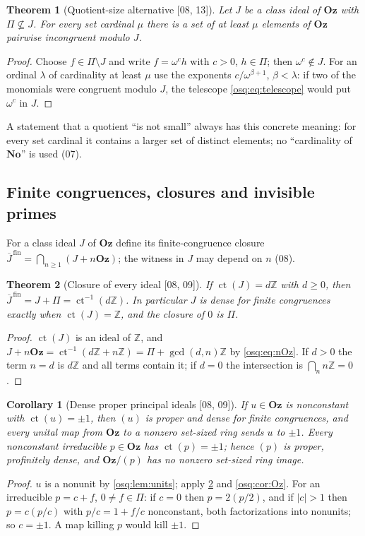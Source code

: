 \documentclass[11pt,letterpaper]{article}
\numberwithin{equation}{section}
\newtheorem{theorem}{Theorem}[section]
\newtheorem{corollary}[corollary]{Corollary}
\theoremstyle{definition}
\theoremstyle{remark}
\theoremstyle{plain}
\newcommand{\No}{\mathbf{No}}
\newcommand{\Oz}{\mathbf{Oz}}
\newcommand{\Z}{\mathbb Z}
\newcommand{\ct}{\operatorname{ct}}
\newcommand{\src}[1]{\textup{\textsf{[#1]}}}
\begin{document}
\begin{theorem}[Quotient-size alternative \src{08, 13}]\label{osq:thm:idealsize}
Let $J$ be a class ideal of $\Oz$ with $\Pi\not\subseteq J$. For every set cardinal $\mu$
there is a set of at least $\mu$ elements of $\Oz$ pairwise incongruent modulo $J$.
\end{theorem}
\begin{proof}
Choose $f\in\Pi\setminus J$ and write $f=\omega^ch$ with $c>0$, $h\in\Pi$; then
$\omega^c\notin J$. For an ordinal $\lambda$ of cardinality at least $\mu$ use the
exponents $c/\omega^{\beta+1}$, $\beta<\lambda$: if two of the monomials were congruent
modulo $J$, the telescope \eqref{osq:eq:telescope} would put $\omega^c$ in $J$.
\end{proof}

A statement that a quotient ``is not small'' always has this concrete meaning: for every
set cardinal it contains a larger set of distinct elements; no ``cardinality of $\No$'' is
used (07).

\subsection{Finite congruences, closures and invisible primes}\label{osq:sub:closures}

For a class ideal $J$ of $\Oz$ define its finite-congruence closure
$\overline J^{\,\mathrm{fin}}=\bigcap_{n\ge1}(J+n\Oz)$; the witness in $J$ may depend on
$n$ (08).

\begin{theorem}[Closure of every ideal \src{08, 09}]\label{osq:thm:closure}
If $\ct(J)=d\Z$ with $d\ge0$, then $\overline J^{\,\mathrm{fin}}=J+\Pi=\ct^{-1}(d\Z)$. In
particular $J$ is dense for finite congruences exactly when $\ct(J)=\Z$, and the closure of
$0$ is $\Pi$.
\end{theorem}
\begin{proof}
$\ct(J)$ is an ideal of $\Z$, and $J+n\Oz=\ct^{-1}(d\Z+n\Z)=\Pi+\gcd(d,n)\Z$ by
\eqref{osq:eq:nOz}. If $d>0$ the term $n=d$ is $d\Z$ and all terms contain it; if $d=0$ the
intersection is $\bigcap_nn\Z=0$.
\end{proof}

\begin{corollary}[Dense proper principal ideals \src{08, 09}]\label{osq:cor:dense}
If $u\in\Oz$ is nonconstant with $\ct(u)=\pm1$, then $(u)$ is proper and dense for finite
congruences, and every unital map from $\Oz$ to a nonzero set-sized ring sends $u$ to
$\pm1$. Every nonconstant irreducible $p\in\Oz$ has $\ct(p)=\pm1$; hence $(p)$ is proper,
profinitely dense, and $\Oz/(p)$ has no nonzero set-sized ring image.
\end{corollary}
\begin{proof}
$u$ is a nonunit by \cref{osq:lem:units}; apply \cref{osq:thm:closure} and
\cref{osq:cor:Oz}. For an irreducible $p=c+f$, $0\ne f\in\Pi$: if $c=0$ then
$p=2(p/2)$, and if $|c|>1$ then $p=c(p/c)$ with $p/c=1+f/c$ nonconstant, both
factorizations into nonunits; so $c=\pm1$. A map killing $p$ would kill $\pm1$.
\end{proof}
\end{document}
